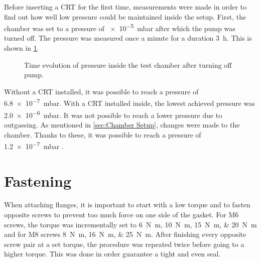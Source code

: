 Before inserting a CRT for the first time, measurements were made in order to find out how well low pressure could be maintained inside the setup. First, the chamber was set to a pressure of \SI{e-5}{\milli\bar} after which the pump was turned off. The pressure was measured once a minute for a duration \SI{3}{\hour}. This is shown in \cref{fig:Time evolution of pressure inside the test chamber after turning off pump}. 

\begin{figure}[ht]
	\centering
		
	\begin{tikzpicture}
		
	\end{tikzpicture}
	
	\caption{Time evolution of pressure inside the test chamber after turning off pump.}
	\label{fig:Time evolution of pressure inside the test chamber after turning off pump}
\end{figure}

Without a CRT installed, it was possible to reach a pressure of \SI{6.8e-7}{\milli\bar}. With a CRT installed inside, the lowest achieved pressure was \SI{2.0e-6}{\milli\bar}. It was not possible to reach a lower pressure due to outgassing. As mentioned in \cref{sec:Chamber Setup}, changes were made to the chamber. Thanks to these, it was possible to reach a pressure of \SI{1.2e-7}{\milli\bar} .

\section{Fastening}
\label{sec:Fastening}

When attaching flanges, it is important to start with a low torque and to fasten opposite screws to prevent too much force on one side of the gasket. For M6 screws, the torque was incrementally set to \SIlist{6;10;15;20}{\newton\meter} and for M8 screws \SIlist{8;16;25}{\newton\meter}. After finishing every opposite screw pair at a set torque, the procedure was repeated twice before going to a higher torque. This was done in order guarantee a tight and even seal.